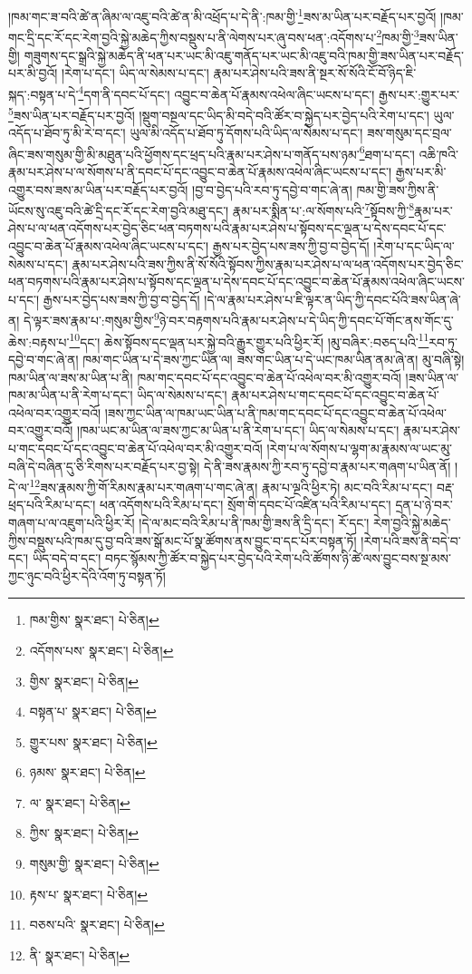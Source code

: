 །ཁམ་གང་ཟ་བའི་ཚེ་ན་ཞིམ་ལ་འཇུ་བའི་ཚེ་ན་མི་འཕྲོད་པ་དེ་ནི་:ཁམ་གྱི་\footnote{ཁམ་གྱིས་  སྣར་ཐང་།  པེ་ཅིན། }ཟས་མ་ཡིན་པར་བརྗོད་པར་བྱའོ། །ཁམ་གང་དྲི་དང་རོ་དང་རེག་བྱའི་སྐྱེ་མཆེད་ཀྱིས་བསྡུས་པ་ནི་ལེགས་པར་ཞུ་བས་ཕན་:འདོགས་པ་\footnote{འདོགས་པས་  སྣར་ཐང་།  པེ་ཅིན། }ཁམ་གྱི་\footnote{གྱིས་  སྣར་ཐང་།  པེ་ཅིན། }ཟས་ཡིན་གྱི། གཟུགས་དང་སྒྲའི་སྐྱེ་མཆེད་ནི་ཕན་པར་ཡང་མི་འཇུ་གནོད་པར་ཡང་མི་འཇུ་བའི་ཁམ་གྱི་ཟས་ཡིན་པར་བརྗོད་པར་མི་བྱའོ། །རེག་པ་དང་། ཡིད་ལ་སེམས་པ་དང་། རྣམ་པར་ཤེས་པའི་ཟས་ནི་སྔར་སོ་སོའི་ངོ་བོ་ཉིད་ཇི་སྐད་:བསྟན་པ་དེ་\footnote{བསྟན་པ་  སྣར་ཐང་།  པེ་ཅིན། }དག་ནི་དབང་པོ་དང་། འབྱུང་བ་ཆེན་པོ་རྣམས་འཕེལ་ཞིང་ཡངས་པ་དང་། རྒྱས་པར་:གྱུར་པར་\footnote{གྱུར་པས་  སྣར་ཐང་།  པེ་ཅིན། }ཟས་ཡིན་པར་བརྗོད་པར་བྱའོ། །སྡུག་བསྔལ་དང་ཡིད་མི་བདེ་བའི་ཚོར་བ་སྐྱེད་པར་བྱེད་པའི་རེག་པ་དང་། ཡུལ་འདོད་པ་ཐོབ་ཏུ་མི་རེ་བ་དང་། ཡུལ་མི་འདོད་པ་ཐོབ་ཏུ་དོགས་པའི་ཡིད་ལ་སེམས་པ་དང་། ཟས་གསུམ་དང་བྲལ་ཞིང་ཟས་གསུམ་གྱི་མི་མཐུན་པའི་ཕྱོགས་དང་ཕྲད་པའི་རྣམ་པར་ཤེས་པ་གནོད་པས་ཉམ་\footnote{ཉམས་  སྣར་ཐང་།  པེ་ཅིན། }ཐག་པ་དང་། འཆི་ཁའི་རྣམ་པར་ཤེས་པ་ལ་སོགས་པ་ནི་དབང་པོ་དང་འབྱུང་བ་ཆེན་པོ་རྣམས་འཕེལ་ཞིང་ཡངས་པ་དང་། རྒྱས་པར་མི་འགྱུར་བས་ཟས་མ་ཡིན་པར་བརྗོད་པར་བྱའོ། །བྱ་བ་བྱེད་པའི་རབ་ཏུ་དབྱེ་བ་གང་ཞེ་ན། ཁམ་གྱི་ཟས་ཀྱིས་ནི་ཡོངས་སུ་འཇུ་བའི་ཚེ་དྲི་དང་རོ་དང་རེག་བྱའི་མཐུ་དང་། རྣམ་པར་སྨིན་པ་:ལ་སོགས་པའི་\footnote{ལ་  སྣར་ཐང་།  པེ་ཅིན། }སྟོབས་ཀྱི་\footnote{ཀྱིས་  སྣར་ཐང་།  པེ་ཅིན། }རྣམ་པར་ཤེས་པ་ལ་ཕན་འདོགས་པར་བྱེད་ཅིང་ཕན་བཏགས་པའི་རྣམ་པར་ཤེས་པ་སྟོབས་དང་ལྡན་པ་དེས་དབང་པོ་དང་འབྱུང་བ་ཆེན་པོ་རྣམས་འཕེལ་ཞིང་ཡངས་པ་དང་། རྒྱས་པར་བྱེད་པས་ཟས་ཀྱི་བྱ་བ་བྱེད་དོ། །རེག་པ་དང་ཡིད་ལ་སེམས་པ་དང་། རྣམ་པར་ཤེས་པའི་ཟས་ཀྱིས་ནི་སོ་སོའི་སྟོབས་ཀྱིས་རྣམ་པར་ཤེས་པ་ལ་ཕན་འདོགས་པར་བྱེད་ཅིང་ཕན་བཏགས་པའི་རྣམ་པར་ཤེས་པ་སྟོབས་དང་ལྡན་པ་དེས་དབང་པོ་དང་འབྱུང་བ་ཆེན་པོ་རྣམས་འཕེལ་ཞིང་ཡངས་པ་དང་། རྒྱས་པར་བྱེད་པས་ཟས་ཀྱི་བྱ་བ་བྱེད་དོ། །དེ་ལ་རྣམ་པར་ཤེས་པ་ཇི་ལྟར་ན་ཡིད་ཀྱི་དབང་པོའི་ཟས་ཡིན་ཞེ་ན། དེ་ལྟར་ཟས་རྣམ་པ་:གསུམ་གྱིས་\footnote{གསུམ་གྱི་  སྣར་ཐང་།  པེ་ཅིན། }ཉེ་བར་བརྟགས་པའི་རྣམ་པར་ཤེས་པ་དེ་ཡིད་ཀྱི་དབང་པོ་གོང་ནས་གོང་དུ་ཆེས་:བརྟས་པ་\footnote{རྟས་པ་  སྣར་ཐང་།  པེ་ཅིན། }དང་། ཆེས་སྟོབས་དང་ལྡན་པར་སྐྱེ་བའི་རྒྱུར་གྱུར་པའི་ཕྱིར་རོ། །མུ་བཞིར་:བཅད་པའི་\footnote{བཅས་པའི་  སྣར་ཐང་།  པེ་ཅིན། }རབ་ཏུ་དབྱེ་བ་གང་ཞེ་ན། ཁམ་གང་ཡིན་པ་དེ་ཟས་ཀྱང་ཡིན་ལ། ཟས་གང་ཡིན་པ་དེ་ཡང་ཁམ་ཡིན་ནམ་ཞེ་ན། མུ་བཞི་སྟེ། ཁམ་ཡིན་ལ་ཟས་མ་ཡིན་པ་ནི། ཁམ་གང་དབང་པོ་དང་འབྱུང་བ་ཆེན་པོ་འཕེལ་བར་མི་འགྱུར་བའོ། །ཟས་ཡིན་ལ་ཁམ་མ་ཡིན་པ་ནི་རེག་པ་དང་། ཡིད་ལ་སེམས་པ་དང་། རྣམ་པར་ཤེས་པ་གང་དབང་པོ་དང་འབྱུང་བ་ཆེན་པོ་འཕེལ་བར་འགྱུར་བའོ། །ཟས་ཀྱང་ཡིན་ལ་ཁམ་ཡང་ཡིན་པ་ནི་ཁམ་གང་དབང་པོ་དང་འབྱུང་བ་ཆེན་པོ་འཕེལ་བར་འགྱུར་བའོ། །ཁམ་ཡང་མ་ཡིན་ལ་ཟས་ཀྱང་མ་ཡིན་པ་ནི་རེག་པ་དང་། ཡིད་ལ་སེམས་པ་དང་། རྣམ་པར་ཤེས་པ་གང་དབང་པོ་དང་འབྱུང་བ་ཆེན་པོ་འཕེལ་བར་མི་འགྱུར་བའོ། །རེག་པ་ལ་སོགས་པ་ལྷག་མ་རྣམས་ལ་ཡང་མུ་བཞི་དེ་བཞིན་དུ་ཅི་རིགས་པར་བརྗོད་པར་བྱ་སྟེ། དེ་ནི་ཟས་རྣམས་ཀྱི་རབ་ཏུ་དབྱེ་བ་རྣམ་པར་གཞག་པ་ཡིན་ནོ། །དེ་ལ་\footnote{ནི་  སྣར་ཐང་།  པེ་ཅིན། }ཟས་རྣམས་ཀྱི་གོ་རིམས་རྣམ་པར་གཞག་པ་གང་ཞེ་ན། རྣམ་པ་ལྔའི་ཕྱིར་ཏེ། མང་བའི་རིམ་པ་དང་། བརྡ་ཕྲད་པའི་རིམ་པ་དང་། ཕན་འདོགས་པའི་རིམ་པ་དང་། སྲོག་གི་དབང་པོ་འཛིན་པའི་རིམ་པ་དང་། དྲན་པ་ཉེ་བར་གཞག་པ་ལ་འཇུག་པའི་ཕྱིར་རོ། །དེ་ལ་མང་བའི་རིམ་པ་ནི་ཁམ་གྱི་ཟས་ནི་དྲི་དང་། རོ་དང་། རེག་བྱའི་སྐྱེ་མཆེད་ཀྱིས་བསྡུས་པའི་ཁམ་དུ་བྱ་བའི་ཟས་སྒོ་མང་པོ་སྣ་ཚོགས་ནས་བྱུང་བ་དང་པོར་བསྟན་ཏོ། །རེག་པའི་ཟས་ནི་བདེ་བ་དང་། ཡིད་བདེ་བ་དང་། བཏང་སྙོམས་ཀྱི་ཚོར་བ་སྐྱེད་པར་བྱེད་པའི་རེག་པའི་ཚོགས་ཉི་ཚེ་ལས་བྱུང་བས་སྔ་མས་ཀྱང་ཉུང་བའི་ཕྱིར་དེའི་འོག་ཏུ་བསྟན་ཏོ། 